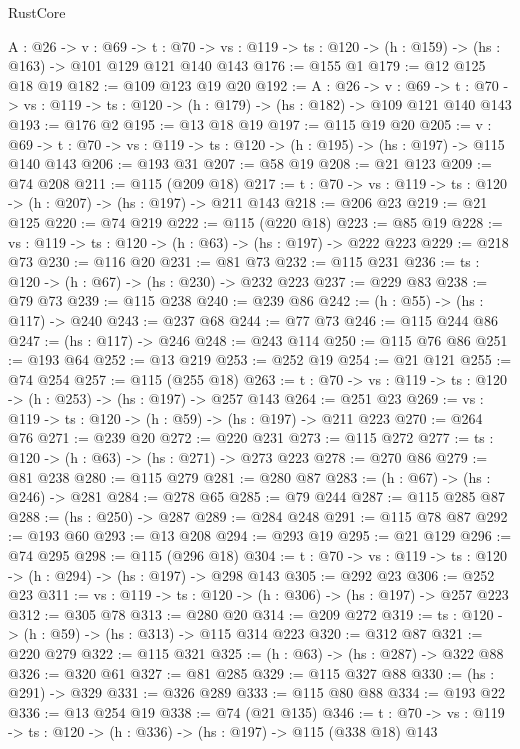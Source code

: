 \begin{lexlean}{RustCore}
\begin{coremodule}
  {A : @26} ->
  {v : @69} ->
  {t : @70} -> {vs : @119} -> {ts : @120} -> (h : @159) -> (hs : @163) -> @101 @129 @121 @140 @143
@176 := @155 @1
@179 := @12 @125 @18 @19
@182 := @109 @123 @19 @20
@192 := {A : @26} ->
  {v : @69} ->
  {t : @70} -> {vs : @119} -> {ts : @120} -> (h : @179) -> (hs : @182) -> @109 @121 @140 @143
@193 := @176 @2
@195 := @13 @18 @19
@197 := @115 @19 @20
@205 := {v : @69} ->
  {t : @70} -> {vs : @119} -> {ts : @120} -> (h : @195) -> (hs : @197) -> @115 @140 @143
@206 := @193 @31
@207 := @58 @19
@208 := @21 @123
@209 := @74 @208
@211 := @115 (@209 @18)
@217 := {t : @70} -> {vs : @119} -> {ts : @120} -> (h : @207) -> (hs : @197) -> @211 @143
@218 := @206 @23
@219 := @21 @125
@220 := @74 @219
@222 := @115 (@220 @18)
@223 := @85 @19
@228 := {vs : @119} -> {ts : @120} -> (h : @63) -> (hs : @197) -> @222 @223
@229 := @218 @73
@230 := @116 @20
@231 := @81 @73
@232 := @115 @231
@236 := {ts : @120} -> (h : @67) -> (hs : @230) -> @232 @223
@237 := @229 @83
@238 := @79 @73
@239 := @115 @238
@240 := @239 @86
@242 := (h : @55) -> (hs : @117) -> @240
@243 := @237 @68
@244 := @77 @73
@246 := @115 @244 @86
@247 := (hs : @117) -> @246
@248 := @243 @114
@250 := @115 @76 @86
@251 := @193 @64
@252 := @13 @219
@253 := @252 @19
@254 := @21 @121
@255 := @74 @254
@257 := @115 (@255 @18)
@263 := {t : @70} -> {vs : @119} -> {ts : @120} -> (h : @253) -> (hs : @197) -> @257 @143
@264 := @251 @23
@269 := {vs : @119} -> {ts : @120} -> (h : @59) -> (hs : @197) -> @211 @223
@270 := @264 @76
@271 := @239 @20
@272 := @220 @231
@273 := @115 @272
@277 := {ts : @120} -> (h : @63) -> (hs : @271) -> @273 @223
@278 := @270 @86
@279 := @81 @238
@280 := @115 @279
@281 := @280 @87
@283 := (h : @67) -> (hs : @246) -> @281
@284 := @278 @65
@285 := @79 @244
@287 := @115 @285 @87
@288 := (hs : @250) -> @287
@289 := @284 @248
@291 := @115 @78 @87
@292 := @193 @60
@293 := @13 @208
@294 := @293 @19
@295 := @21 @129
@296 := @74 @295
@298 := @115 (@296 @18)
@304 := {t : @70} -> {vs : @119} -> {ts : @120} -> (h : @294) -> (hs : @197) -> @298 @143
@305 := @292 @23
@306 := @252 @23
@311 := {vs : @119} -> {ts : @120} -> (h : @306) -> (hs : @197) -> @257 @223
@312 := @305 @78
@313 := @280 @20
@314 := @209 @272
@319 := {ts : @120} -> (h : @59) -> (hs : @313) -> @115 @314 @223
@320 := @312 @87
@321 := @220 @279
@322 := @115 @321
@325 := (h : @63) -> (hs : @287) -> @322 @88
@326 := @320 @61
@327 := @81 @285
@329 := @115 @327 @88
@330 := (hs : @291) -> @329
@331 := @326 @289
@333 := @115 @80 @88
@334 := @193 @22
@336 := @13 @254 @19
@338 := @74 (@21 @135)
@346 := {t : @70} -> {vs : @119} -> {ts : @120} -> (h : @336) -> (hs : @197) -> @115 (@338 @18) @143

\end{coremodule}
\end{lexlean}

